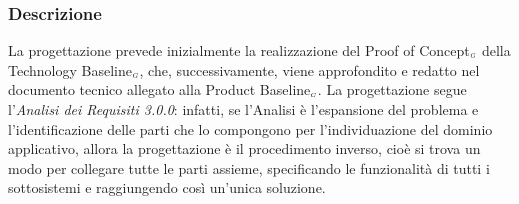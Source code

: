 \subsubsection{Descrizione}\label{ProcessiPrimariProgettazioneDescrizione}
La progettazione prevede inizialmente la realizzazione del Proof of Concept$_{\scaleto{G}{3pt}}$ della Technology Baseline$_{\scaleto{G}{3pt}}$, che, successivamente, viene approfondito e redatto nel documento tecnico allegato alla Product Baseline$_{\scaleto{G}{3pt}}$. La progettazione segue l'\textit{Analisi dei Requisiti 3.0.0}: infatti, se l'Analisi è l'espansione del problema e l'identificazione delle parti che lo compongono per l'individuazione del dominio applicativo, allora la progettazione è il procedimento inverso, cioè si trova un modo per collegare tutte le parti assieme, specificando le funzionalità di tutti i sottosistemi e raggiungendo così un'unica soluzione.
%
